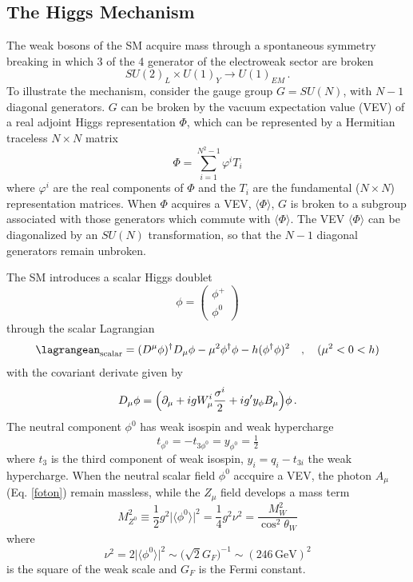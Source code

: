 \subsection{The Higgs Mechanism}
The weak bosons of the SM acquire mass through a spontaneous symmetry breaking in which 3 of the 4 generator of the electroweak sector are broken
\begin{equation*}
SU(2)_L\times U(1)_Y \rightarrow U(1)_{EM}\,.
\end{equation*}
To illustrate the mechanism, consider the gauge group $G=SU(N)$, with $N-1$ diagonal generators. $G$ can be broken by the vacuum expectation value (VEV) of a real adjoint Higgs representation $\Phi$, which can be represented by a Hermitian traceless $N\times N$ matrix
\begin{equation}
\Phi=\sum_{i=1}^{N^2-1}\varphi^i T_i
\end{equation}
where $\varphi^i$ are the real components of $\Phi$ and the $T_i$ are the fundamental ($N\times N$) representation matrices. When $\Phi$ acquires a VEV,  $\langle\Phi\rangle$, $G$ is broken to a subgroup associated with those generators which commute with $\langle\Phi\rangle$. The VEV $\langle\Phi\rangle$ can be diagonalized by an $SU(N)$ transformation, so that the $N-1$ diagonal generators remain unbroken.

The SM introduces a scalar Higgs doublet 
\begin{equation}
\phi=\left(\begin{array}{c} \phi^+\\ \phi^0 \end{array} \right)
\end{equation}
through the scalar Lagrangian
\begin{equation}
\lagrangean_{\text{scalar}}=(D^\mu\phi)^\dagger D_\mu\phi - \mu^2\phi^\dagger\phi - h(\phi^\dagger\phi)^2\quad , \quad (\mu^2 < 0 < h)
\end{equation}  
with the covariant derivate given by
\begin{equation}
D_\mu\phi =\Bigl(\partial_\mu+igW_\mu^i \frac{\sigma^i}{2} + ig'y_\phi B_\mu \Bigr)\phi\,. \label{covder}
\end{equation}
The neutral component $\phi^0$ has weak isospin and weak hypercharge  
\begin{equation}
t_{\phi^0}=-t_{3\phi^0}=y_{\phi^0}=\tfrac{1}{2}
\end{equation}
where $t_3$ is the third component of weak isospin, $y_i=q_i-t_{3i}$ the weak hypercharge.
When the neutral scalar field $\phi^0$ accquire a VEV, the photon $A_\mu$ (Eq. \ref{foton}) remain massless, while the $Z_\mu$ field develops a mass term
\begin{equation}
M_{Z^0}^2\equiv \frac{1}{2}g^2\bigl|\langle\phi^0\rangle\bigr|^2 = \frac{1}{4}g^2\nu^2 = \frac{M_W^2}{\cos^2\theta_W} \label{ZmassSM}
\end{equation}
where 
\begin{equation}
\nu^2=2\bigl|\langle\phi^0\rangle\bigr|^2 \sim \bigl(\sqrt{2}G_F\bigr)^{-1} \sim (246\,\text{GeV})^2
\end{equation}
is the square of the weak scale and $G_F$ is the Fermi constant. 

